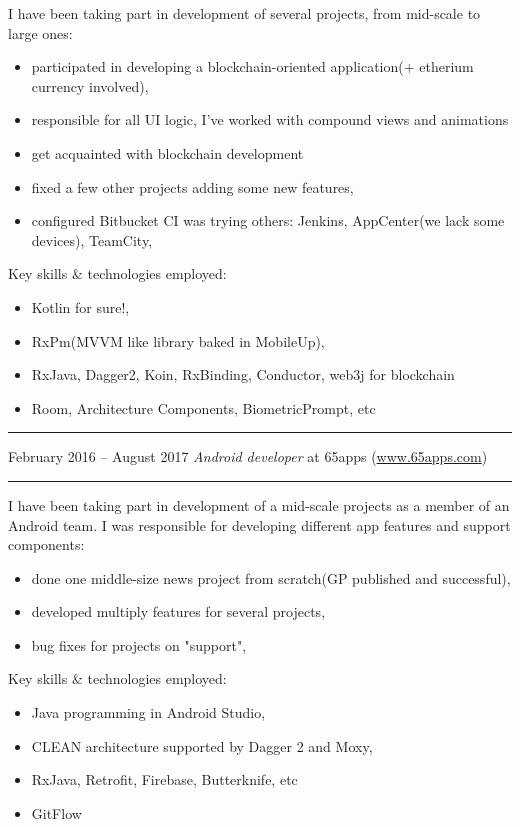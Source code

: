 \documentclass[11pt]{article}
\newcommand\CvSmallSkipLength{0.5em}
\newcommand\CvSkip[1]{\vspace{#1}}
\newcommand\CvSmallSkip{\CvSkip{\CvSmallSkipLength}}
\newcommand\CvRule{\begingroup\color{CvRuleColor}\hrule\endgroup}
\newcommand\CvWorkplaceHeader[5]{\begingroup%
  \CvRule%
  \fboxsep0pt%
  \colorbox{CvWorkplaceHeaderColor}{%
    \begin{minipage}{\linewidth-2\fboxsep}%
\CvSmallSkip%
#1 -- #2 \hfill \textit{#3} at #4 (\href{http://#5/}{#5})%
\CvSmallSkip%
    \end{minipage}%
  }%
  \CvRule%
\endgroup%
}
\newenvironment{CvWorkplaceDescription}{%
    \begingroup\setlength\parskip{\CvSmallSkipLength}%
  }{%
    \CvSmallSkip\endgroup%
  }
\begin{document}
\begin{CvWorkplaceDescription}
I have been taking part in development of several projects, from mid-scale to large ones:
\begin{itemize}[noitemsep]
  \item participated in developing a blockchain-oriented application(+ etherium currency involved),
  \item responsible for all UI logic, I've worked with compound views and animations
  \item get acquainted with blockchain development
  \item fixed a few other projects adding some new features,
  \item configured Bitbucket CI was trying others: Jenkins, AppCenter(we lack some devices), TeamCity,
\end{itemize}

Key skills \& technologies employed:
\begin{itemize}[noitemsep]
  \item Kotlin for sure!,
  \item RxPm(MVVM like library baked in MobileUp),
  \item RxJava, Dagger2, Koin, RxBinding, Conductor, web3j for blockchain
  \item Room, Architecture Components, BiometricPrompt, etc
\end{itemize}
\end{CvWorkplaceDescription}

\CvWorkplaceHeader{February 2016}{August 2017}{Android developer}{65apps}{www.65apps.com}

\begin{CvWorkplaceDescription}
I have been taking part in development of a mid-scale projects as a member of an Android team. I was responsible for developing different app features and support components:
\begin{itemize}[noitemsep]
  \item done one middle-size news project from scratch(GP published and successful),
  \item developed multiply features for several projects,
  \item bug fixes for projects on "support",
\end{itemize}

Key skills \& technologies employed:
\begin{itemize}[noitemsep]
  \item Java programming in Android Studio,
  \item CLEAN architecture supported by Dagger 2 and Moxy,
  \item RxJava, Retrofit, Firebase, Butterknife, etc
  \item GitFlow
\end{itemize}
\end{CvWorkplaceDescription}
\end{document}
